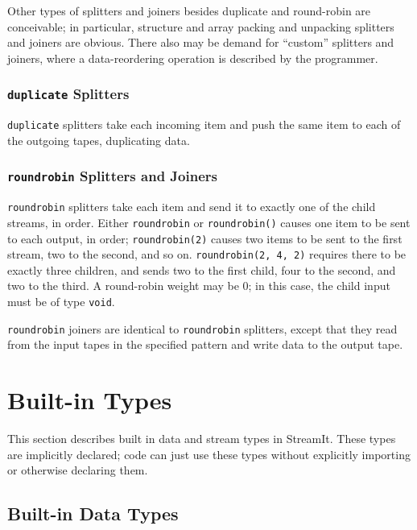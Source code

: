 \documentclass[11pt]{article}
\begin{document}
\begin{note}
  Other types of splitters and joiners besides duplicate and
  round-robin are conceivable; in particular, structure and array
  packing and unpacking splitters and joiners are obvious.  There also
  may be demand for ``custom'' splitters and joiners, where a
  data-reordering operation is described by the programmer.
\end{note}

\subsubsection{\lstinline|duplicate| Splitters}
\label{sec:expr-duplicate}

\lstinline|duplicate| splitters take each incoming item and push the
same item to each of the outgoing tapes, duplicating data.

\subsubsection{\lstinline|roundrobin| Splitters and Joiners}
\label{sec:expr-round-robin}

\lstinline|roundrobin| splitters take each item and send it to exactly
one of the child streams, in order.  Either \lstinline|roundrobin| or
\lstinline|roundrobin()| causes one item to be sent to each output, in
order; \lstinline|roundrobin(2)| causes two items to be sent to the first
stream, two to the second, and so on.  \lstinline|roundrobin(2, 4, 2)|
requires there to be exactly three children, and sends two to the
first child, four to the second, and two to the third.  A round-robin
weight may be 0; in this case, the child input must be of type
\lstinline|void|.

\lstinline|roundrobin| joiners are identical to \lstinline|roundrobin|
splitters, except that they read from the input tapes in the specified
pattern and write data to the output tape.


\section{Built-in Types}

This section describes built in data and stream types in StreamIt.
These types are implicitly declared; code can just use these types
without explicitly importing or otherwise declaring them.

\subsection{Built-in Data Types}
\end{document}
